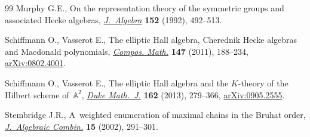 \documentclass[pdftex]{sigma}
\numberwithin{equation}{section}
\theoremstyle{definition}
\begin{document}
\begin{thebibliography}{99}
Murphy G.E., On the representation theory of the symmetric groups and
 associated {H}ecke algebras,
 \href{https://doi.org/10.1016/0021-8693(92)90045-N}{\textit{J.~Algebra}}
 \textbf{152} (1992), 492--513.

Schiffmann O., Vasserot E., The elliptic {H}all algebra, {C}herednik {H}ecke
 algebras and {M}acdonald polynomials,
 \href{https://doi.org/10.1112/S0010437X10004872}{\textit{Compos. Math.}}
 \textbf{147} (2011), 188--234,
 \href{http://arxiv.org/abs/0802.4001}{arXiv:0802.4001}.

Schiffmann O., Vasserot E., The elliptic {H}all algebra and the {$K$}-theory of
 the {H}ilbert scheme of~{${\mathbb A}^2$},
 \href{https://doi.org/10.1215/00127094-1961849}{\textit{Duke Math.~J.}}
 \textbf{162} (2013), 279--366,
 \href{http://arxiv.org/abs/0905.2555}{arXiv:0905.2555}.

Stembridge J.R., A~weighted enumeration of maximal chains in the {B}ruhat
 order, \href{https://doi.org/10.1023/A:1015068609503}{\textit{J.~Algebraic
 Combin.}} \textbf{15} (2002), 291--301.

\end{thebibliography}\LastPageEnding
\end{document}
